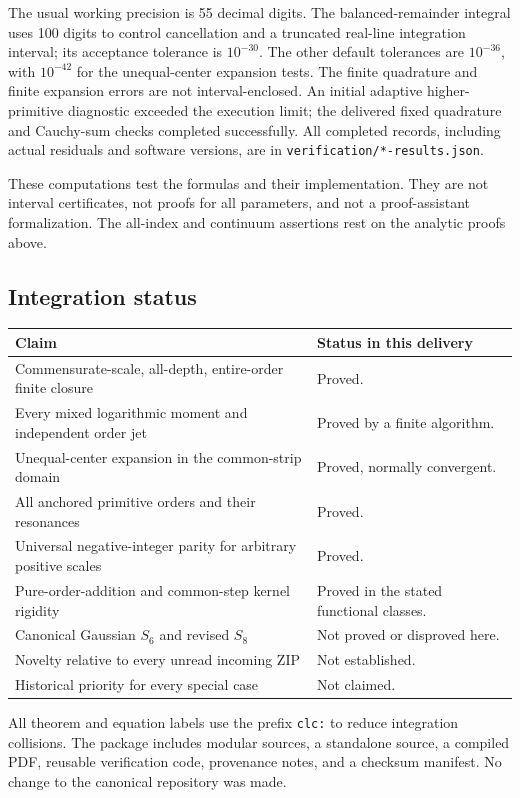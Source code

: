 \documentclass[11pt,a4paper]{article}
\numberwithin{equation}{section}
\theoremstyle{definition}\newtheorem{definition}[theorem]{Definition}
\theoremstyle{remark}\newtheorem{remark}[theorem]{Remark}
\begin{document}
The usual working precision is 55 decimal digits. The balanced-remainder
integral uses 100 digits to control cancellation and a truncated
real-line integration interval; its acceptance tolerance is $10^{-30}$.
The other default tolerances are $10^{-36}$, with $10^{-42}$ for the
unequal-center expansion tests. The finite quadrature and finite expansion
errors are not interval-enclosed. An initial adaptive higher-primitive
diagnostic exceeded the execution limit; the delivered fixed quadrature
and Cauchy-sum checks completed successfully. All completed records,
including actual residuals and software versions, are in
\texttt{verification/*-results.json}.

These computations test the formulas and their implementation. They are
not interval certificates, not proofs for all parameters, and not a
proof-assistant formalization. The all-index and continuum assertions
rest on the analytic proofs above.

\subsection{Integration status}
\begin{center}
\begin{tabular}{p{}p{}}
\toprule
Claim & Status in this delivery\\
\midrule
Commensurate-scale, all-depth, entire-order finite closure & Proved.\\
Every mixed logarithmic moment and independent order jet & Proved by a finite algorithm.\\
Unequal-center expansion in the common-strip domain & Proved, normally convergent.\\
All anchored primitive orders and their resonances & Proved.\\
Universal negative-integer parity for arbitrary positive scales & Proved.\\
Pure-order-addition and common-step kernel rigidity & Proved in the stated functional classes.\\
Canonical Gaussian $S_6$ and revised $S_8$ & Not proved or disproved here.\\
Novelty relative to every unread incoming ZIP & Not established.\\
Historical priority for every special case & Not claimed.\\
\bottomrule
\end{tabular}
\end{center}
All theorem and equation labels use the prefix \texttt{clc:} to reduce
integration collisions. The package includes modular sources, a standalone
source, a compiled PDF, reusable verification code, provenance notes,
and a checksum manifest. No change to the canonical repository was made.
\end{document}
